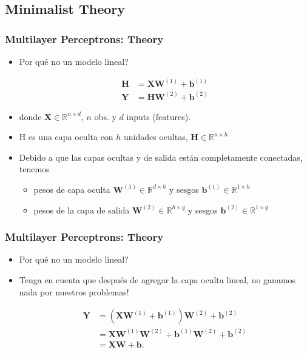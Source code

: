 \documentclass[
  shownotes,
  xcolor={svgnames},
  hyperref={colorlinks,citecolor=DarkBlue,linkcolor=DarkRed,urlcolor=DarkBlue}
  , aspectratio=169]{beamer}
\begin{document}
\subsection{Minimalist Theory}
\begin{frame}
\frametitle{Multilayer Perceptrons: Theory}

\begin{itemize}
 \item Por qué no un modelo lineal? 


\begin{align} 
 \mathbf{H} & = \mathbf{X} \mathbf{W}^{(1)} + \mathbf{b}^{(1)} \\ \nonumber
 \mathbf{Y} & = \mathbf{H}\mathbf{W}^{(2)} + \mathbf{b}^{(2)}  \nonumber
  \end{align} 
\bigskip
\item  donde $\mathbf{X} \in \mathbb{R}^{n \times d}$,  $n$ obs. y $d$ inputs (features). 
\item H es una capa oculta con $h$ unidades ocultas, $\mathbf{H} \in \mathbb{R}^{n \times h}$

\item  Debido a que las capas ocultas y de salida están completamente conectadas, tenemos
\begin{itemize}
 \item pesos de capa oculta $\mathbf{W}^{(1)} \in \mathbb{R}^{d \times h}$ y sesgos $\mathbf{b}^{(1)} \in \mathbb{R}^{1 \times h}$  
\item pesos de la capa de salida $\mathbf{W}^{(2)} \in \mathbb{R}^{h \times q}$ y sesgos $\mathbf{b}^{(2)} \in \mathbb{R}^{1 \times q}$
\end{itemize}

\end{itemize}

\end{frame}
\begin{frame}
\frametitle{Multilayer Perceptrons: Theory}

\begin{itemize}
 \item Por qué no un modelo lineal?
\medskip
\item Tenga en cuenta que después de agregar la capa oculta lineal, no ganamos nada por nuestros problemas!
\medskip


\begin{align}
\mathbf{Y} &= (\mathbf{X} \mathbf{W}^{(1)} + \mathbf{b}^{(1)})\mathbf{W}^{(2)} + \mathbf{b}^{(2)} \\ \nonumber
&= \mathbf{X} \mathbf{W}^{(1)}\mathbf{W}^{(2)} + \mathbf{b}^{(1)} \mathbf{W}^{(2)} + \mathbf{b}^{(2)} \\ \nonumber
&= \mathbf{X} \mathbf{W} + \mathbf{b}. \nonumber
\end{align} 
\end{itemize}

\end{frame}
\end{document}
